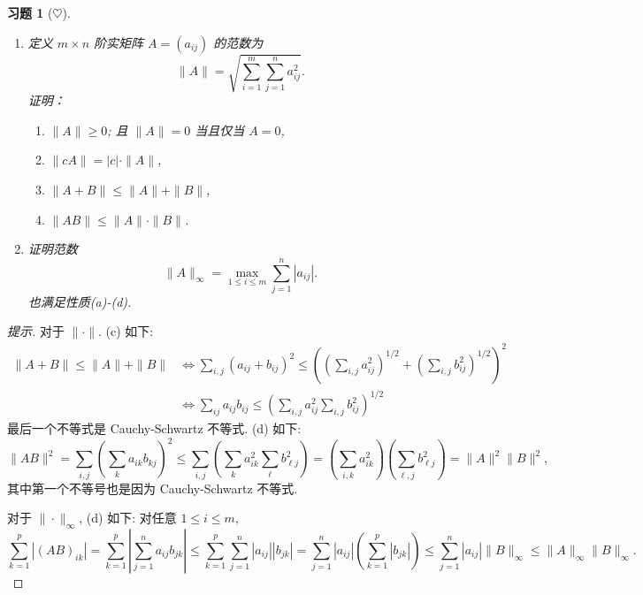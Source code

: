 \documentclass[UTF8]{ctexart}
\newcommand{\norm}[1]{\|{#1}\|}
\newtheorem{ex}[thm]{习题}
\begin{document}
\begin{ex}[$\heartsuit $]
	\begin{enumerate}
	\item 定义 $m \times n$ 阶实矩阵 $A=(a_{ij})$ 的范数为
	$$ 	\|A\|= \sqrt{ \sum_{i=1}^m \sum_{j=1}^n a_{ij}^2}. 	$$
	证明：
	\begin{enumerate}
		\item $\|A\| \geq 0$; 且 $\|A\|=0$ 当且仅当 $A=0$,
		\item $\|cA\| = |c|\cdot\|A\|$,
		\item $\|A+B\|\leq\|A\|+\|B\|$,
		\item $\|AB\|\leq\|A\|\cdot\|B\|$.
	\end{enumerate}
   \item 证明范数
	$$ \|A\|_{\infty} = \max_{1\leq i\leq m} \sum_{j=1}^n |a_{ij}|.
	$$
	也满足性质(a)-(d).
	\end{enumerate}
\end{ex}
\begin{proof}[提示]
对于 $\norm{\cdot}$. (c) 如下:
$$\begin{array}{ll}
\norm{A+B}\leq\norm{A}+\norm{B} &\Leftrightarrow \displaystyle{\sum_{i,j}(a_{ij}+b_{ij})^2\leq\left((\sum_{i,j}a_{ij}^2)^{1/2}+(\sum_{i,j}b_{ij}^2)^{1/2}\right)^2} \\ &\Leftrightarrow \displaystyle{\sum_{ij}a_{ij}b_{ij}\leq\left(\sum_{i,j}a_{ij}^2\sum_{i,j}b_{ij}^2\right)^{1/2}}
\end{array}$$
最后一个不等式是 Cauchy-Schwartz 不等式. (d) 如下:
$$\norm{AB}^2=\sum_{i,j}\left(\sum_ka_{ik}b_{kj}\right)^2\leq\sum_{i,j}\left(\sum_{k}a_{ik}^2\sum_\ell b_{\ell j}^2\right)=\left(\sum_{i,k}a_{ik}^2\right)\left(\sum_{\ell,j}b_{\ell j}^2\right)=\norm{A}^2\norm{B}^2,$$
其中第一个不等号也是因为 Cauchy-Schwartz 不等式.

对于 $\|\cdot\|_\infty$,  (d) 如下: 对任意 $1\leq i\leq m$,
$$\sum_{k=1}^p|(AB)_{ik}|=\sum_{k=1}^p\left|\sum_{j=1}^na_{ij}b_{jk}\right|\leq \sum_{k=1}^p\sum_{j=1}^n|a_{ij}||b_{jk}|=\sum_{j=1}^n|a_{ij}|\left(\sum_{k=1}^p|b_{jk}|\right)\leq \sum_{j=1}^n|a_{ij}|\norm{B}_\infty\leq \norm{A}_\infty\norm{B}_\infty.$$
	\end{proof}
\end{document}
